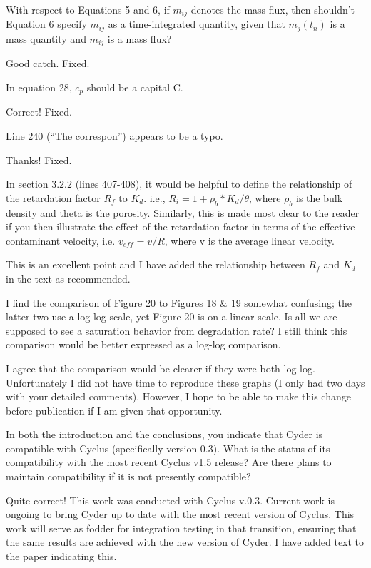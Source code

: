 \documentclass[answers,12pt]{exam}
\begin{document}
\begin{questions}
\question With respect to Equations 5 and 6, if $m_{ij}$ denotes the mass flux, 
then shouldn't Equation 6 specify $m_{ij}$ as a time-integrated quantity, given 
that $m_j(t_n)$ is a mass quantity and $m_{ij}$ is a mass flux?
\begin{solution}
        Good catch. Fixed.
\end{solution}

\question In equation 28, $c_p$ should be a capital C.
\begin{solution}
Correct! Fixed.
\end{solution}

\question Line 240 (``The correspon'') appears to be a typo.
\begin{solution}
Thanks! Fixed.
\end{solution}

\question In section 3.2.2 (lines 407-408), it would be helpful to define the 
relationship of the retardation factor $R_f$ to $K_d$. i.e., $R_i = 1 + \rho_b 
* K_d / \theta$, where $\rho_b$ is the bulk density and theta is the porosity.  
Similarly, this is made most clear to the reader if you then illustrate the 
effect of the retardation factor in terms of the effective contaminant 
velocity, i.e. $v_{eff} = v/R$, where v is the average linear velocity.
\begin{solution}
        This is an excellent point and I have added the relationship between 
        $R_f$ and $K_d$ in the text as recommended.
\end{solution}

\question I find the comparison of Figure 20 to Figures 18 \& 19 somewhat 
confusing; the latter two use a log-log scale, yet Figure 20 is on a linear 
scale. Is all we are supposed to see a saturation behavior from degradation 
rate? I still think this comparison would be better expressed as a log-log 
comparison.
\begin{solution}
I agree that the comparison would be clearer if they were both log-log. 
        Unfortunately I did not have time to reproduce these graphs (I only had 
        two days with your detailed comments). However, I hope to be able to 
        make this change before publication if I am given that opportunity.
\end{solution}

\question In both the introduction and the conclusions, you indicate that Cyder 
is compatible with Cyclus (specifically version 0.3). What is the status of its 
compatibility with the most recent Cyclus v1.5 release? Are there plans to 
maintain compatibility if it is not presently compatible?
\begin{solution}
Quite correct! This work was conducted with Cyclus v.0.3. Current work is 
        ongoing to bring Cyder up to date with the most recent version of 
        Cyclus. This work will serve as fodder for integration testing in that 
        transition, ensuring that the same results are achieved with the new 
        version of Cyder. I have added text to the paper indicating this.
\end{solution}


\end{questions}
\end{document}
